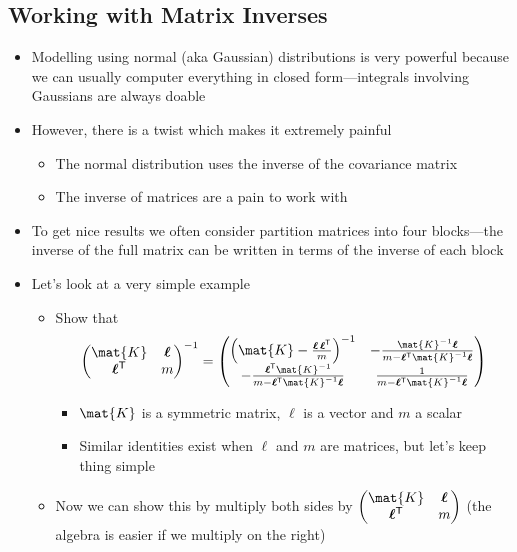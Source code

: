 \documentclass[11pt]{article}
\newcommand{\tr}{\textsf{T}}
\newcommand{\vl}{\bm{\ell}}
\begin{document}
\subsection{Working with Matrix Inverses}
\label{sec:orgf04a6ad}
\begin{itemize}
\item Modelling using normal (aka Gaussian) distributions is very
powerful because we can usually computer everything in closed
form---integrals involving Gaussians are always doable
\item However, there is a twist which makes it extremely painful
\begin{itemize}
\item The normal distribution uses the inverse of the covariance matrix
\item The inverse of matrices are a pain to work with
\end{itemize}
\item To get nice results we often consider partition matrices into
four blocks---the inverse of the full matrix can be written in
terms of the inverse of each block
\item Let's look at a very simple example
\begin{itemize}
\item Show that
$$ \begin{pmatrix} \mat{K} & \vl \\ \vl^\tr & m \end{pmatrix}^{-1} 
       =  \begin{pmatrix} \left(\mat{K}-\frac{\vl\,\vl^\tr}{m}\right)^{-1}  &
            -\frac{\mat{K}^{-1} \vl}{m-\vl^\tr \mat{K}^{-1}\vl}  \\ 
	    -\frac{\vl^\tr\mat{K}^{-1}}{m-\vl^\tr \mat{K}^{-1}\vl} &
	    \frac{1}{m-\vl^\tr \mat{K}^{-1}\vl} 
       \end{pmatrix} $$
\begin{itemize}
\item \(\mat{K}\) is a symmetric matrix, \(\ell\) is a vector and \(m\) a
scalar
\item Similar identities exist when \(\ell\) and \(m\) are matrices,
but let's keep thing simple
\end{itemize}
\item Now we can show this by multiply both sides by \(\begin{pmatrix}
       \mat{K} & \vl \\ \vl^\tr & m \end{pmatrix}\) (the algebra is
easier if we multiply on the right)

\end{itemize}
\end{itemize}
\end{document}
